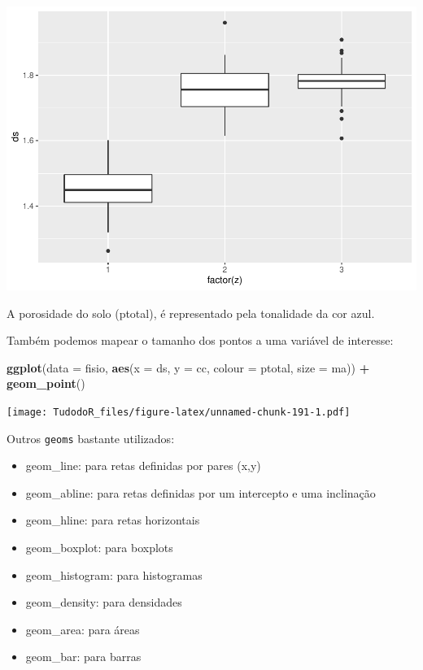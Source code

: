 \documentclass[
]{book}
\newenvironment{Shaded}{\begin{snugshade}}{\end{snugshade}}
\newcommand{\DataTypeTok}[1]{\textcolor[rgb]{0.13,0.29,0.53}{#1}}
\newcommand{\KeywordTok}[1]{\textcolor[rgb]{0.13,0.29,0.53}{\textbf{#1}}}
\newcommand{\NormalTok}[1]{#1}
\newcommand{\OperatorTok}[1]{\textcolor[rgb]{0.81,0.36,0.00}{\textbf{#1}}}
\newcommand{\StringTok}[1]{\textcolor[rgb]{0.31,0.60,0.02}{#1}}
\providecommand{\tightlist}{%
  \setlength{\itemsep}{0pt}\setlength{\parskip}{0pt}}
\begin{document}
\includegraphics{TudodoR_files/figure-latex/unnamed-chunk-190-1.pdf}

A porosidade do solo (ptotal), é representado pela tonalidade da cor azul.

Também podemos mapear o tamanho dos pontos a uma variável de interesse:

\begin{Shaded}
\begin{Highlighting}[]
\KeywordTok{ggplot}\NormalTok{(}\DataTypeTok{data =}\NormalTok{ fisio, }\KeywordTok{aes}\NormalTok{(}\DataTypeTok{x =}\NormalTok{ ds, }\DataTypeTok{y =}\NormalTok{ cc, }\DataTypeTok{colour =}\NormalTok{ ptotal, }\DataTypeTok{size =}\NormalTok{ ma)) }\OperatorTok{+}
\StringTok{  }\KeywordTok{geom_point}\NormalTok{()}
\end{Highlighting}
\end{Shaded}

\texttt{[image: TudodoR\_files/figure-latex/unnamed-chunk-191-1.pdf]}

Outros \texttt{geoms} bastante utilizados:

\begin{itemize}
\tightlist
\item
  geom\_line: para retas definidas por pares (x,y)
\item
  geom\_abline: para retas definidas por um intercepto e uma inclinação
\item
  geom\_hline: para retas horizontais
\item
  geom\_boxplot: para boxplots
\item
  geom\_histogram: para histogramas
\item
  geom\_density: para densidades
\item
  geom\_area: para áreas
\item
  geom\_bar: para barras
\end{itemize}
\end{document}
